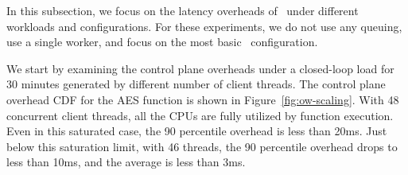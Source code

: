 
In this subsection, we focus on the latency overheads of \sysname~under different workloads and configurations.
For these experiments, we do not use any queuing, use a single worker, and focus on the most basic \sysname~configuration.  

We start by examining the control plane overheads under a closed-loop load for 30 minutes generated by different number of client threads. 
The control plane overhead CDF for the AES function is shown in Figure~\ref{fig:ow-scaling}. %
With 48 concurrent client threads, all the CPUs are fully utilized by function execution. 
Even in this saturated case, the 90 percentile overhead is less than 20ms. 
Just below this saturation limit, with 46 threads, the 90 percentile overhead drops to less than 10ms, and the average is less than 3ms. 


